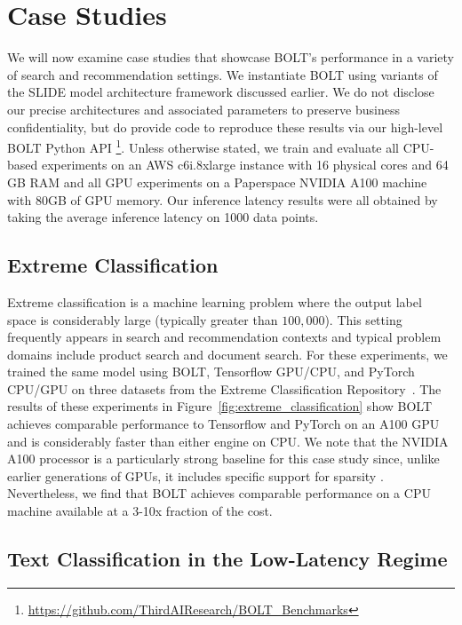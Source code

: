 \documentclass[sigconf]{acmart}
\begin{document}
\section{Case Studies}

We will now examine case studies that showcase BOLT's performance in a variety of search and recommendation settings. We instantiate BOLT using variants of the SLIDE model architecture framework discussed earlier. We do not disclose our precise architectures and associated parameters to preserve business confidentiality, but do provide code to reproduce these results via our high-level BOLT Python API \footnote{\url{https://github.com/ThirdAIResearch/BOLT_Benchmarks}}. Unless otherwise stated, we train and evaluate all CPU-based experiments on an AWS c6i.8xlarge instance with 16 physical cores and 64 GB RAM and all GPU experiments on a Paperspace NVIDIA A100 machine with 80GB of GPU memory. Our inference latency results were all obtained by taking the average inference latency on 1000 data points.

\subsection{Extreme Classification}

Extreme classification is a machine learning problem where the output label space is considerably large (typically greater than $100,000$). This setting frequently appears in search and recommendation contexts and typical problem domains include product search and document search. For these experiments, we trained the same model using BOLT, Tensorflow GPU/CPU, and PyTorch CPU/GPU on three datasets from the Extreme Classification Repository~\cite{Bhatia16}. The results of these experiments in Figure~\ref{fig:extreme_classification} show BOLT achieves comparable performance to Tensorflow and PyTorch on an A100 GPU and is considerably faster than either engine on CPU. We note that the NVIDIA A100 processor is a particularly strong baseline for this case study since, unlike earlier generations of GPUs, it includes specific support for sparsity \cite{nvidia-sparsity}. Nevertheless, we find that BOLT achieves comparable performance on a CPU machine available at a 3-10x fraction of the cost. 



\subsection{Text Classification in the Low-Latency Regime}
\end{document}

